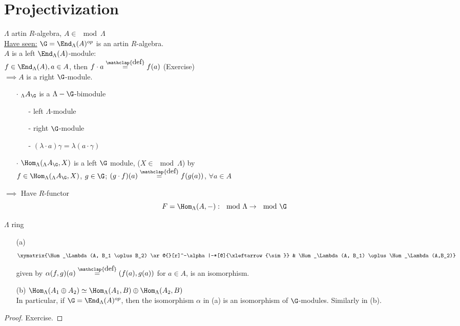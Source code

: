 
\section{Projectivization}
$\Lambda$ artin $R$-algebra, $A \in \mod \Lambda$\\
\underline{Have seen:} $\G = \End_\Lambda(A)^{op}$ is an artin $R$-algebra.\\
$A$ is a left $\End_\Lambda(A)$-module:\\
$f \in \End_\Lambda(A), a \in A$, then $f\cdot a \stackrel{\mathclap{\normalfont\mbox{def}}}{=} f(a)$ (Exercise)\\
$\implies A$ is a right $\G$-module.

\begin{exer}
\begin{enumerate}
\item[]
\item[$\cdot$] $_\Lambda A_\G$ is a $\Lambda-\G$-bimodule
\begin{enumerate}
\item[-] left $\Lambda$-module
\item[-] right $\G$-module
\item[-] $(\lambda \cdot a)\gamma = \lambda(a \cdot \gamma)$
\end{enumerate}

\item[$\cdot$] $\Hom_\Lambda(_\Lambda A_\G, X)$ is a left $\G$ module, ($X \in \mod \Lambda$) by\\
$f \in \Hom_\Lambda(_\Lambda A_\G, X)$, $g \in \G$; $(g\cdot f)(a) \stackrel{\mathclap{\normalfont\mbox{def}}}{=} f(g(a))$, $\forall a \in A$
\end{enumerate}
$\implies$ Have $R$-functor \[ F = \Hom_\Lambda(A, -): \mod\Lambda \to \mod\G \]
\end{exer}

\begin{lem}
\label{lem:47}
$\Lambda$ ring
\begin{enumerate}
\item[(a)] \[\xymatrix{\Hom_\Lambda(A, B_1 \oplus B_2) \ar@{}[r]^-\alpha|-*[@]{\xleftarrow{\sim}}  & \Hom_\Lambda(A, B_1) \oplus \Hom_\Lambda(A,B_2)}\]
given by $\alpha(f, g)(a) \stackrel{\mathclap{\normalfont\mbox{def}}}{=} (f(a), g(a)) $ for $a \in A$, is an isomorphism.
\item[(b)] $\Hom_\Lambda(A_1 \oplus A_2) \simeq \Hom_\Lambda(A_1, B) \oplus \Hom_\Lambda(A_2, B)$\\
In particular, if $\G = \End_\Lambda(A)^{op}$, then the isomorphism $\alpha$ in (a) is an isomorphism of $\G$-modules. Similarly in (b).
\end{enumerate}

\begin{proof}
Exercise.
\end{proof}
\end{lem}


